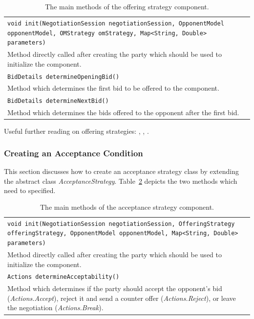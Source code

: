 \documentclass[]{llncs}
\begin{document}
\begin{table}[h]
\begin{tabular}{m{}}
\hline
\texttt{void init(NegotiationSession negotiationSession, OpponentModel opponentModel, 
	OMStrategy omStrategy, Map<String, Double> parameters)}\\
Method directly called after creating the party which should be used to initialize the component.\\
\hline
\texttt{BidDetails determineOpeningBid()}\\
Method which determines the first bid to be offered to the component.\\
\hline
\texttt{BidDetails determineNextBid()}\\
Method which determines the bids offered to the opponent after the first bid.\\
\hline
\end{tabular}
\caption{The main methods of the offering strategy component.}
\label{tab:BOAbs}
\end{table}

Useful further reading on offering strategies: \cite{Ros06}, \cite{Fat02}, \cite{Far03}.

\subsubsection{Creating an Acceptance Condition}
This section discusses how to create an acceptance strategy class by extending the abstract class \textit{AcceptanceStrategy}. Table~\ref{tab:BOAas} depicts the two methods which need to specified.

\begin{table}[h]
\begin{tabular}{m{}}
\hline
\texttt{void init(NegotiationSession negotiationSession, OfferingStrategy offeringStrategy,
			OpponentModel opponentModel, Map<String, Double> parameters)}\\
Method directly called after creating the party which should be used to initialize the component.\\
\hline
\texttt{Actions determineAcceptability()}\\
Method which determines if the party should accept the opponent's bid (\textit{Actions.Accept}), reject it and send a counter offer (\textit{Actions.Reject}), or leave the negotiation (\textit{Actions.Break}).\\
\hline
\end{tabular}
\caption{The main methods of the acceptance strategy component.}
\label{tab:BOAas}
\end{table}
\end{document}
